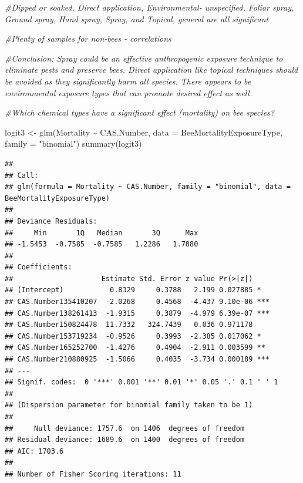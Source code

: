 \documentclass[
  12pt,
]{article}
\newenvironment{Shaded}{\begin{snugshade}}{\end{snugshade}}
\newcommand{\AttributeTok}[1]{\textcolor[rgb]{0.77,0.63,0.00}{#1}}
\newcommand{\CommentTok}[1]{\textcolor[rgb]{0.56,0.35,0.01}{\textit{#1}}}
\newcommand{\FunctionTok}[1]{\textcolor[rgb]{0.00,0.00,0.00}{#1}}
\newcommand{\NormalTok}[1]{#1}
\newcommand{\OtherTok}[1]{\textcolor[rgb]{0.56,0.35,0.01}{#1}}
\newcommand{\SpecialCharTok}[1]{\textcolor[rgb]{0.00,0.00,0.00}{#1}}
\newcommand{\StringTok}[1]{\textcolor[rgb]{0.31,0.60,0.02}{#1}}
\begin{document}
\begin{Shaded}
\begin{Highlighting}[]
\CommentTok{\#Dipped or soaked, Direct application, Environmental{-} unspecified, Foliar spray, Ground spray, Hand spray, Spray, and Topical, general are all significant }

\CommentTok{\#Plenty of samples for non{-}bees {-} correlations  }

\CommentTok{\#Conclusion: Spray could be an effective anthropogenic exposure technique to eliminate pests and preserve bees. Direct application like topical techniques should be avoided as they significantly harm all species. There appears to be environmental exposure types that can promote desired effect as well.}
\end{Highlighting}
\end{Shaded}

\begin{Shaded}
\begin{Highlighting}[]
\CommentTok{\#Which chemical types have a significant effect (mortality) on bee species?}

\NormalTok{logit3 }\OtherTok{\textless{}{-}} \FunctionTok{glm}\NormalTok{(Mortality }\SpecialCharTok{\textasciitilde{}}\NormalTok{ CAS.Number, }\AttributeTok{data =}\NormalTok{ BeeMortalityExposureType, }\AttributeTok{family =} \StringTok{"binomial"}\NormalTok{)}
\FunctionTok{summary}\NormalTok{(logit3)}
\end{Highlighting}
\end{Shaded}

\begin{verbatim}
## 
## Call:
## glm(formula = Mortality ~ CAS.Number, family = "binomial", data = BeeMortalityExposureType)
## 
## Deviance Residuals: 
##     Min       1Q   Median       3Q      Max  
## -1.5453  -0.7585  -0.7585   1.2286   1.7080  
## 
## Coefficients:
##                     Estimate Std. Error z value Pr(>|z|)    
## (Intercept)           0.8329     0.3788   2.199 0.027885 *  
## CAS.Number135410207  -2.0268     0.4568  -4.437 9.10e-06 ***
## CAS.Number138261413  -1.9315     0.3879  -4.979 6.39e-07 ***
## CAS.Number150824478  11.7332   324.7439   0.036 0.971178    
## CAS.Number153719234  -0.9526     0.3993  -2.385 0.017062 *  
## CAS.Number165252700  -1.4276     0.4904  -2.911 0.003599 ** 
## CAS.Number210880925  -1.5066     0.4035  -3.734 0.000189 ***
## ---
## Signif. codes:  0 '***' 0.001 '**' 0.01 '*' 0.05 '.' 0.1 ' ' 1
## 
## (Dispersion parameter for binomial family taken to be 1)
## 
##     Null deviance: 1757.6  on 1406  degrees of freedom
## Residual deviance: 1689.6  on 1400  degrees of freedom
## AIC: 1703.6
## 
## Number of Fisher Scoring iterations: 11
\end{verbatim}
\end{document}
